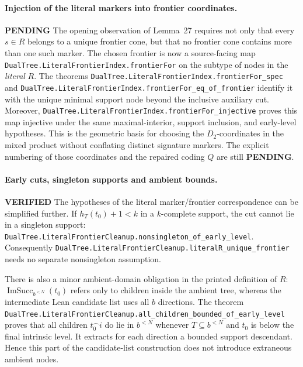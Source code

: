\documentclass[11pt]{article}
\newcommand{\ok}{\textcolor{green!40!black}{\textbf{VERIFIED}}}
\newcommand{\todo}{\textcolor{gray!70!black}{\textbf{PENDING}}}
\newcommand{\lean}[1]{\texttt{#1}}
\begin{document}
\paragraph{Injection of the literal markers into frontier coordinates.} \todo
The opening observation of Lemma~27 requires not only that every
$s\in R$ belongs to a unique frontier cone, but that no frontier cone
contains more than one such marker.  The chosen frontier is now a
source-facing map
\lean{DualTree.LiteralFrontierIndex.frontierFor}
on the subtype of nodes in the \emph{literal} $R$.
The theorems
\lean{DualTree.LiteralFrontierIndex.frontierFor_spec} and
\lean{DualTree.LiteralFrontierIndex.frontierFor_eq_of_frontier}
identify it with the unique minimal support node beyond the
inclusive auxiliary cut.  Moreover,
\lean{DualTree.LiteralFrontierIndex.frontierFor_injective}
proves this map injective under the same maximal-interior, support
inclusion, and early-level hypotheses.  This is the geometric
basis for choosing the $D_2$-coordinates in the mixed product
without conflating distinct signature markers.  The explicit
numbering of those coordinates and the repaired coding $Q$
are still \todo.

\paragraph{Early cuts, singleton supports and ambient bounds.} \ok
The hypotheses of the literal marker/frontier correspondence can be
simplified further.  If $h_T(t_0)+1<k$ in a $k$-complete support,
the cut cannot lie in a singleton support:
\lean{DualTree.LiteralFrontierCleanup.nonsingleton_of_early_level}.
Consequently
\lean{DualTree.LiteralFrontierCleanup.literalR_unique_frontier}
needs no separate nonsingleton assumption.

There is also a minor ambient-domain obligation in the printed definition
of $R$: $\operatorname{ImSucc}_{b^{<N}}(t_0)$ refers only to children inside
the ambient tree, whereas the intermediate Lean candidate list uses
all $b$ directions.  The theorem
\lean{DualTree.LiteralFrontierCleanup.all_children_bounded_of_early_level}
proves that all children $t_0^\frown i$ do lie in $b^{<N}$
whenever $T\subseteq b^{<N}$ and $t_0$ is below the final intrinsic
level.  It extracts for each direction a bounded support descendant.
Hence this part of the candidate-list construction does not introduce
extraneous ambient nodes.
\end{document}
